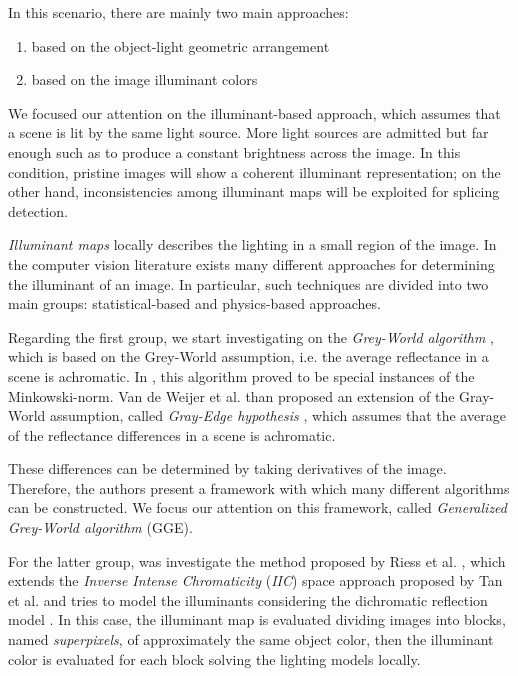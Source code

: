 In this scenario, there are mainly two main approaches:
\begin{enumerate}
\item based on the object-light geometric arrangement
\item based on the image illuminant colors
\end{enumerate}

We focused our attention on the illuminant-based approach, which assumes that a scene is lit by the same light source. More light sources are admitted but far enough such as to produce a constant brightness across the image. In this condition, pristine images will show a coherent illuminant representation; on the other hand, inconsistencies among illuminant maps will be exploited for splicing detection. 

\emph{Illuminant maps} locally describes the lighting in a small region of the image. In the computer vision literature exists many different approaches for determining the illuminant of an image. In particular, such techniques are divided into two main groups: statistical-based and physics-based approaches.

Regarding the first group, we start investigating on the \emph{Grey-World algorithm} \cite{Buchsbaum19801}, which is based on the Grey-World assumption, i.e. the average reflectance in a scene is achromatic. In \cite{finlayson2004shades}, this algorithm proved to be special instances of the Minkowski-norm. Van de Weijer et al. \cite{van2007edge} than proposed an extension of the Gray-World assumption, called \emph{Gray-Edge hypothesis} \cite{van2007edge}, which assumes that the average of the reflectance differences in a scene is achromatic. 

These differences can be determined by taking derivatives of the image. Therefore, the authors present a framework with which many different algorithms can be constructed.
We focus our attention on this framework, called \emph{Generalized Grey-World algorithm} (GGE).

For the latter group, was investigate the method proposed by Riess et al. \cite{riess2010scene}, which extends the \emph{Inverse Intense Chromaticity} (\emph{IIC}) space approach proposed by Tan et al. \cite{tan2004color} and tries to model the illuminants considering the dichromatic reflection model \cite{tominaga1989standard}. In this case, the illuminant map is evaluated dividing  images into blocks, named \emph{superpixels}, of approximately the same object color, then the illuminant color is evaluated for each block solving the lighting models locally. 


